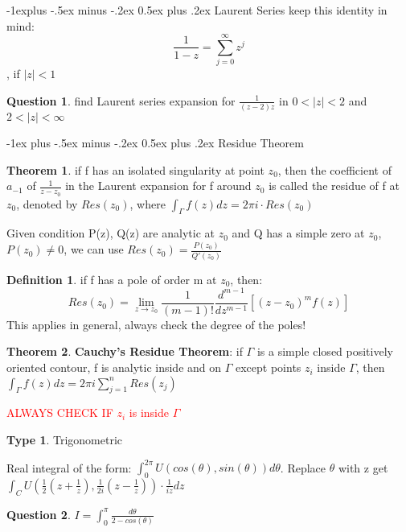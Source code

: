 \documentclass[10pt,landscape]{article}
\makeatletter
\renewcommand{\section}{\@startsection{section}{1}{0mm}%
                                {-1ex plus -.5ex minus -.2ex}%
                                {0.5ex plus .2ex}%
                                {\normalfont\large\bfseries}}
\renewcommand{\subsection}{\@startsection{subsection}{2}{0mm}%
                                {-1explus -.5ex minus -.2ex}%
                                {0.5ex plus .2ex}%
                                {\normalfont\normalsize\bfseries}}
\newcommand\todo[1]{\textcolor{red}{#1}}
\theoremstyle{definition}
\newtheorem*{question}{Question}
\newtheorem{theorem}{Theorem}
\newtheorem{defin}{Definition}
\newtheorem{type}{Type}
\theoremstyle{remark}
\makeatother
\begin{document}
\begin{multicols}{3}
\subsection{Laurent Series}
keep this identity in mind: 
\color{red}
$$\frac{1}{1-z} = \sum^{\infty}_{j=0}z^j$$, if $|z|<1$
\color{black}

\begin{question}
find Laurent series expansion for $\frac{1}{(z-2)z}$ in $0<|z|<2$ and $2<|z| < \infty$
\end{question}



\section{Residue Theorem}
\begin{theorem}
if f has an isolated singularity at point $z_0$, then the coefficient of $a_{-1}$ of $\frac{1}{z-z_0}$ in the Laurent expansion for f around $z_0$ is called the residue of f at $z_0$, denoted by $Res(z_0)$, where $\int_\Gamma f(z)dz = 2\pi i \cdot Res(z_0)$
\end{theorem}
Given condition P(z), Q(z) are analytic at $z_0$ and Q has a simple zero at $z_0$, $P(z_0) \neq 0$, we can use $Res(z_0) = \frac{P(z_0)}{Q'(z_0)}$


\begin{defin}
if f has a pole of order m at $z_0$, then:
$$Res(z_0) = \lim_{z \rightarrow z_0} \frac{1}{(m-1)!}\frac{d^{m-1}}{dz^{m-1}}[(z-z_0)^mf(z)]$$
This applies in general, always check the degree of the poles!
\end{defin}

\begin{theorem}
\textbf{Cauchy's Residue Theorem}: if $\Gamma$ is a simple closed positively oriented contour, f is analytic inside and on $\Gamma$ except points $z_i$ inside $\Gamma$, then $\int_{\Gamma}f(z)dz = 2\pi i \sum^n_{j=1}Res(z_j)$ 
\end{theorem}
\todo{ALWAYS CHECK IF $z_i$ is inside $\Gamma$}

\begin{type} Trigonometric \par
Real integral of the form: $\int^{2\pi}_0 U(cos(\theta), sin(\theta))d\theta$. Replace $\theta$ with z get $\int_C U(\frac{1}{2}(z+\frac{1}{z}), \frac{1}{2i}(z-\frac{1}{z}))\cdot\frac{1}{iz} dz$
\end{type}

\begin{question}
$I = \int^\pi_0 \frac{d\theta}{2 - cos(\theta)}$
\end{question}


\end{multicols}
\end{document}

